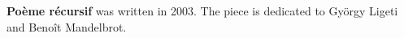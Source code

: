 \textbf{Po\`{e}me r\'{e}cursif} was written in 2003. The piece is dedicated to
Gy\"{o}rgy Ligeti and Beno\^{i}t Mandelbrot.
